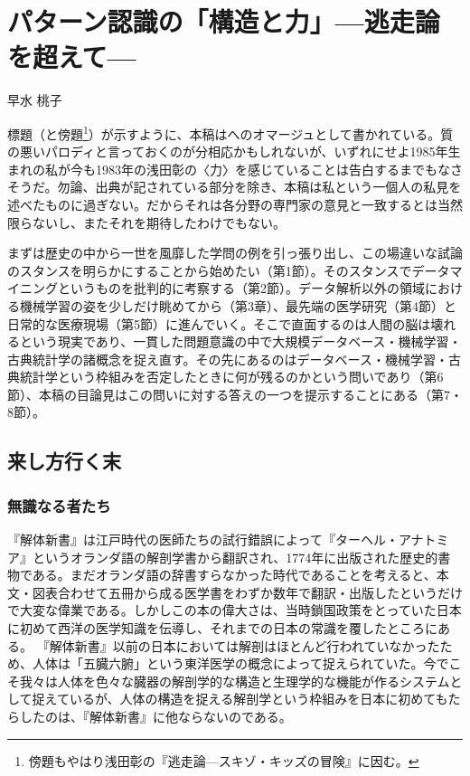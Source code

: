 
\chapter{パターン認識の「構造と力」---逃走論を超えて---}

\begin{flushright}
 {\headfont 早水 桃子} %
\end{flushright}

\begin{spacing}{0.6}
\noindent
{\footnotesize{標題（と傍題\footnote{傍題もやはり浅田彰の『逃走論---スキゾ・キッズの冒険』に因む。}）が示すように、本稿はへのオマージュとして書かれている。質の悪いパロディと言っておくのが分相応かもしれないが、いずれにせよ1985年生まれの私が今も1983年の浅田彰の〈力〉を感じていることは告白するまでもなさそうだ。勿論、出典が記されている部分を除き、本稿は私という一個人の私見を述べたものに過ぎない。だからそれは各分野の専門家の意見と一致するとは当然限らないし、またそれを期待したわけでもない。

\noindent
まずは歴史の中から一世を風靡した学問の例を引っ張り出し、この場違いな試論のスタンスを明らかにすることから始めたい（第1節）。そのスタンスでデータマイニングというものを批判的に考察する（第2節）。データ解析以外の領域における機械学習の姿を少しだけ眺めてから（第3章）、最先端の医学研究（第4節）と日常的な医療現場（第5節）に進んでいく。そこで直面するのは人間の脳は壊れるという現実であり、一貫した問題意識の中で大規模データベース・機械学習・古典統計学の諸概念を捉え直す。その先にあるのはデータベース・機械学習・古典統計学という枠組みを否定したときに何が残るのかという問いであり（第6節）、本稿の目論見はこの問いに対する答えの一つを提示することにある（第7・8節）。
}}
\end{spacing}
 
\section{来し方行く末}
\subsection{無識なる者たち}
『解体新書』は江戸時代の医師たちの試行錯誤によって『ターヘル・アナトミア』というオランダ語の解剖学書から翻訳され、1774年に出版された歴史的書物である。まだオランダ語の辞書すらなかった時代であることを考えると、本文・図表合わせて五冊から成る医学書をわずか数年で翻訳・出版したというだけで大変な偉業である。しかしこの本の偉大さは、当時鎖国政策をとっていた日本に初めて西洋の医学知識を伝導し、それまでの日本の常識を覆したところにある。
『解体新書』以前の日本においては解剖はほとんど行われていなかったため、人体は「五臓六腑」という東洋医学の概念によって捉えられていた。今でこそ我々は人体を色々な臓器の解剖学的な構造と生理学的な機能が作るシステムとして捉えているが、人体の構造を捉える解剖学という枠組みを日本に初めてもたらしたのは、『解体新書』に他ならないのである。

